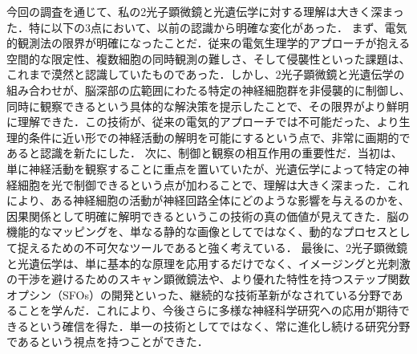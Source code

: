 \documentclass{classes/report}
\begin{document}
今回の調査を通じて、私の2光子顕微鏡と光遺伝学に対する理解は大きく深まった．特に以下の3点において、以前の認識から明確な変化があった．
まず、電気的観測法の限界が明確になったことだ．従来の電気生理学的アプローチが抱える空間的な限定性、複数細胞の同時観測の難しさ、そして侵襲性といった課題は、これまで漠然と認識していたものであった．しかし、2光子顕微鏡と光遺伝学の組み合わせが、脳深部の広範囲にわたる特定の神経細胞群を非侵襲的に制御し、同時に観察できるという具体的な解決策を提示したことで、その限界がより鮮明に理解できた．この技術が、従来の電気的アプローチでは不可能だった、より生理的条件に近い形での神経活動の解明を可能にするという点で、非常に画期的であると認識を新たにした．
次に、制御と観察の相互作用の重要性だ．当初は、単に神経活動を観察することに重点を置いていたが、光遺伝学によって特定の神経細胞を光で制御できるという点が加わることで、理解は大きく深まった．これにより、ある神経細胞の活動が神経回路全体にどのような影響を与えるのかを、因果関係として明確に解明できるというこの技術の真の価値が見えてきた．脳の機能的なマッピングを、単なる静的な画像としてではなく、動的なプロセスとして捉えるための不可欠なツールであると強く考えている．
最後に、2光子顕微鏡と光遺伝学は、単に基本的な原理を応用するだけでなく、イメージングと光刺激の干渉を避けるためのスキャン顕微鏡法や、より優れた特性を持つステップ関数オプシン（SFOs）の開発といった、継続的な技術革新がなされている分野であることを学んだ．これにより、今後さらに多様な神経科学研究への応用が期待できるという確信を得た．単一の技術としてではなく、常に進化し続ける研究分野であるという視点を持つことができた．
\end{document}

